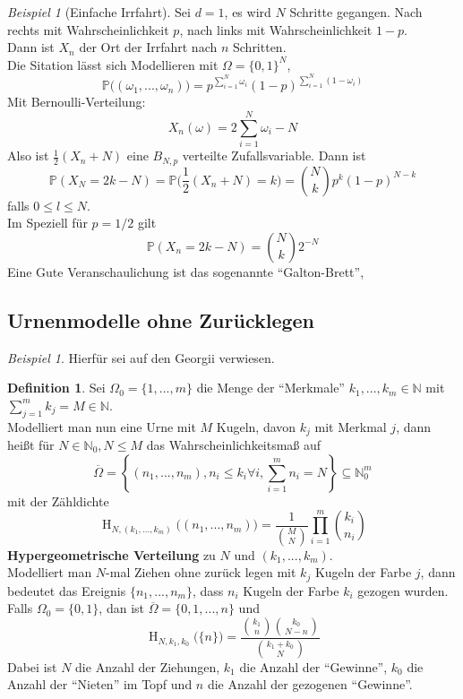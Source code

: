 \documentclass[10pt,a4paper]{article}
\newcommand{\N}{\ensuremath{\mathbb{N}}}
\newcommand{\ol}[1]{\overline{#1}}
\newcommand{\Prb}{\mathbb P}
\newcommand{\Hypg}{\operatorname{H}}
\theoremstyle{plain}
\theoremstyle{definition}
\newtheorem{definition}[theorem]{Definition}
\theoremstyle{remark}
\newtheorem{exm}[theorem]{Beispiel}
\begin{document}
	\begin{exm}[Einfache Irrfahrt]
		Sei $d=1$, es wird $N$ Schritte gegangen. Nach rechts mit Wahrscheinlichkeit $p$, nach links mit Wahrscheinlichkeit $1-p$.\\
		Dann ist $X_n$ der Ort der Irrfahrt nach $n$ Schritten.\\
		Die Sitation lässt sich Modellieren mit $\Omega=\{0,1\}^N$, 
		\[\Prb\big((\omega_1,...,\omega_n)\big)=p^{\sum_{i=1}^N\omega_i}(1-p)^{\sum_{i=1}^{N}(1-\omega_i)}\]
		Mit Bernoulli-Verteilung:
		\[X_n(\omega)=2\sum_{i=1}^{N}\omega_i-N\]
		Also ist $\frac{1}{2}(X_n+N)$ eine $B_{N,p}$ verteilte Zufallsvariable. Dann ist
		\[\Prb(X_N=2k-N)=\Prb\big(\frac{1}{2}(X_n+N)=k\big)=\binom{N}{k}p^k(1-p)^{N-k}
		\]
		falls $0\leq l\leq N$.\\
		Im Speziell für $p=1/2$ gilt
		\[\Prb(X_n=2k-N)=\binom{N}{k}2^{-N}\]
		Eine Gute Veranschaulichung ist das sogenannte \enquote{Galton-Brett},
	\end{exm}


	\subsection{Urnenmodelle ohne Zurücklegen}
	\begin{exm}
		Hierfür sei auf den Georgii verwiesen.
	\end{exm}

	\begin{definition}\label{0212def}
		Sei $\Omega_0=\{1,...,m\}$ die Menge der \enquote{Merkmale} 
		$k_1,...,k_m\in \N$ mit $\sum_{j=1}^{m}k_j=M\in\N$.\\
		Modelliert man nun eine Urne mit $M$ Kugeln, davon $k_j$ mit Merkmal $j$, dann heißt für $N\in\N_0,N\leq M$ das Wahrscheinlichkeitsmaß auf
		\[\ol{\Omega}=\left\{(n_1,...,n_m),n_i\leq k_i\forall i,\sum_{i=1}^{m}n_i=N\right\}\subseteq\N_0^m\]
		mit der Zähldichte
		\[\Hypg_{N,(k_1,...,k_m)}\big((n_1,...,n_m)\big)=\frac{1}{\binom{M}{N}}\prod_{i=1}^m\binom{k_i}{n_i}\]
		\textbf{Hypergeometrische Verteilung} zu $N$ und $(k_1,...,k_m)$.\\
		Modelliert man $N$-mal Ziehen ohne zurück legen mit $k_j$ Kugeln der Farbe $j$, dann bedeutet das Ereignis $\{n_1,...,n_m\}$, dass $n_i$ Kugeln der Farbe $k_i$ gezogen wurden.\\
		Falls $\Omega_0=\{0,1\}$, dan ist $\ol{\Omega}=\{0,1,...,n\}$ und
		\[\Hypg_{N,k_1,k_0}\big(\{n\}\big)=\frac{\binom{k_1}{n}\binom{k_0}{N-n}}{\binom{k_1+k_0}{N}}\]
		Dabei ist $N$ die Anzahl der Ziehungen, $k_1$ die Anzahl der \enquote{Gewinne}, $k_0$ die Anzahl der \enquote{Nieten} im Topf und $n$ die Anzahl der gezogenen \enquote{Gewinne}.
	\end{definition}
\end{document}
